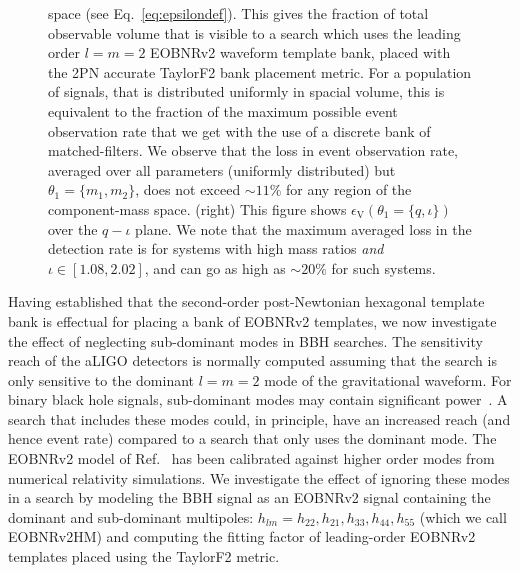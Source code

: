 \begin{figure}
{space (see Eq.~\ref{eq:epsilondef}). 
This gives the 
fraction of total observable volume that is visible to a search which uses the
leading order $l=m=2$ EOBNRv2 waveform template bank, placed with the 2PN 
accurate TaylorF2 bank placement metric. For a population of signals, that is distributed uniformly in spacial volume,
this is equivalent to the fraction of the maximum possible event observation rate that we get with the use of a discrete bank of matched-filters. We observe that the loss in event observation rate,
averaged over all parameters (uniformly distributed) but $\theta_1=\{m_1,m_2\}$,
does not exceed $\sim 11\%$ for any region of the component-mass space.
(right) This figure shows $\epsilon_{\mathrm{V}}\left(\theta_1=\{q,\iota\}\right)$ over the $q-\iota$ plane. We note that the 
maximum averaged loss in the detection rate is for systems
with high mass ratios \textit{and} $\iota\in[1.08,2.02]$, and 
can go as high as $\sim 20\%$ for such systems.
} 
\end{figure}

Having established that the second-order post-Newtonian hexagonal template
bank is effectual for placing a bank of EOBNRv2 templates, we now investigate
the effect of neglecting sub-dominant modes in BBH searches. The sensitivity
reach of the aLIGO detectors is normally computed assuming that the search is
only sensitive to the dominant $l=m=2$ mode of the gravitational waveform. For
binary black hole signals, sub-dominant modes may contain significant
power~\cite{Pekowsky:2012sr}. A search that includes these modes could, in
principle, have an increased reach (and hence event rate) compared to a search
that only uses the dominant mode. The EOBNRv2 model of
Ref.~\cite{BuonannoEOBv2Main} has been calibrated against higher order modes
from numerical relativity simulations. We investigate the effect of ignoring
these modes in a search by modeling the BBH signal as an EOBNRv2 signal
containing the dominant and sub-dominant multipoles: $h_{lm} =
h_{22},h_{21},h_{33},h_{44}, h_{55}$ (which we call EOBNRv2HM) and computing
the fitting factor of leading-order EOBNRv2 templates placed using the
TaylorF2 metric.

